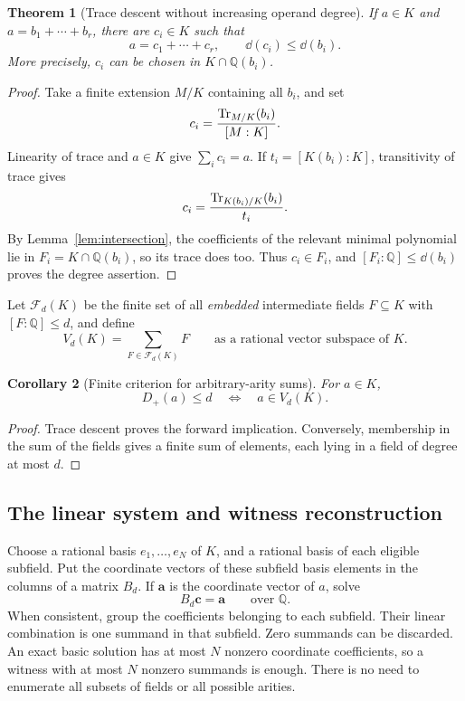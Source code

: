 \documentclass[11pt,a4paper]{article}
\newtheorem{theorem}{Theorem}[section]
\newtheorem{corollary}[theorem]{Corollary}
\theoremstyle{definition}\newtheorem{definition}[theorem]{Definition}
\theoremstyle{remark}\newtheorem{remark}[theorem]{Remark}
\newcommand{\Q}{\mathbb Q}\newcommand{\C}{\mathbb C}\newcommand{\Z}{\mathbb Z}
\newcommand{\Dsum}{D_{+}}\newcommand{\Dprod}{D_{\times}}\newcommand{\Dtwo}{D_{\times,2}}
\begin{document}
\begin{theorem}[Trace descent without increasing operand degree]
\label{thm:trace}
If $a\in K$ and $a=b_1+\cdots+b_r$, there are $c_i\in K$ such that
\[
 a=c_1+\cdots+c_r,\qquad \dd(c_i)\le\dd(b_i).
\]
More precisely, $c_i$ can be chosen in $K\cap\Q(b_i)$.
\end{theorem}
\begin{proof}
Take a finite extension $M/K$ containing all $b_i$, and set
\[
 c_i=\frac{\operatorname{Tr}_{M/K}(b_i)}{[M:K]}.
\]
Linearity of trace and $a\in K$ give $\sum_i c_i=a$. If $t_i=[K(b_i):K]$, transitivity of trace gives
\[
 c_i=\frac{\operatorname{Tr}_{K(b_i)/K}(b_i)}{t_i}.
\]
By Lemma~\ref{lem:intersection}, the coefficients of the relevant minimal polynomial lie in $F_i=K\cap\Q(b_i)$, so its trace does too. Thus $c_i\in F_i$, and $[F_i:\Q]\le\dd(b_i)$ proves the degree assertion.
\end{proof}

Let $\mathcal F_d(K)$ be the finite set of all \emph{embedded} intermediate fields $F\subseteq K$ with $[F:\Q]\le d$, and define
\begin{equation}
 V_d(K)=\sum_{F\in\mathcal F_d(K)}F
 \qquad\text{as a rational vector subspace of }K.
 \label{eq:Vd}
\end{equation}

\begin{corollary}[Finite criterion for arbitrary-arity sums]
\label{cor:sumcriterion}
For $a\in K$,
\[
 \Dsum(a)\le d\quad\Longleftrightarrow\quad a\in V_d(K).
\]
\end{corollary}
\begin{proof}
Trace descent proves the forward implication. Conversely, membership in the sum of the fields gives a finite sum of elements, each lying in a field of degree at most $d$.
\end{proof}

\subsection{The linear system and witness reconstruction}
Choose a rational basis $e_1,\ldots,e_N$ of $K$, and a rational basis of each eligible subfield. Put the coordinate vectors of these subfield basis elements in the columns of a matrix $B_d$. If $\mathbf a$ is the coordinate vector of $a$, solve
\begin{equation}
 B_d\mathbf c=\mathbf a\qquad\text{over }\Q.
 \label{eq:sumsystem}
\end{equation}
When consistent, group the coefficients belonging to each subfield. Their linear combination is one summand in that subfield. Zero summands can be discarded. An exact basic solution has at most $N$ nonzero coordinate coefficients, so a witness with at most $N$ nonzero summands is enough. There is no need to enumerate all subsets of fields or all possible arities.
\end{document}

